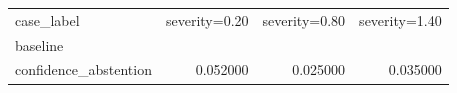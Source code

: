 \begin{tabular}{lrrr}
\toprule
case_label & severity=0.20 & severity=0.80 & severity=1.40 \\
baseline &  &  &  \\
\midrule
confidence_abstention & 0.052000 & 0.025000 & 0.035000 \\
\bottomrule
\end{tabular}

